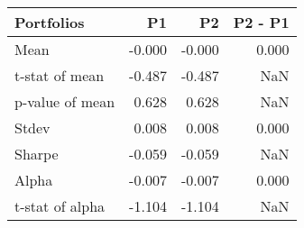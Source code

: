 \begin{tabular}{lrrr}
\toprule
Portfolios & P1 & P2 & P2 - P1 \\
\midrule
Mean & -0.000 & -0.000 & 0.000 \\
t-stat of mean & -0.487 & -0.487 & NaN \\
p-value of mean & 0.628 & 0.628 & NaN \\
Stdev & 0.008 & 0.008 & 0.000 \\
Sharpe & -0.059 & -0.059 & NaN \\
Alpha & -0.007 & -0.007 & 0.000 \\
t-stat of alpha & -1.104 & -1.104 & NaN \\
\bottomrule
\end{tabular}
